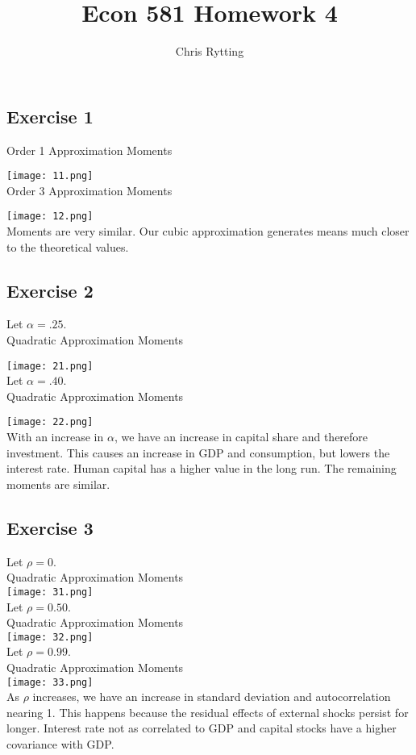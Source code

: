 \documentclass[letterpaper,12pt]{article}
\theoremstyle{definition}
\begin{document}
\title{Econ 581 Homework 4}
\author{Chris Rytting}
\maketitle
\subsection*{Exercise 1}
Order 1 Approximation Moments

\texttt{[image: 11.png]}\\

Order 3 Approximation Moments

\texttt{[image: 12.png]}\\

Moments are very similar.
Our cubic approximation generates means much closer to the theoretical values. 

\subsection*{Exercise 2}
Let $\alpha = .25$.\\
Quadratic Approximation Moments

\texttt{[image: 21.png]}\\

Let $\alpha = .40$.\\
Quadratic Approximation Moments

\texttt{[image: 22.png]}\\

With an increase in $\alpha$, we have an increase in capital share and therefore investment. This causes an increase in GDP and consumption, but lowers the interest rate. Human capital has a higher value in the long run. The remaining moments are similar.

\subsection*{Exercise 3}
Let $\rho = 0$.\\
Quadratic Approximation Moments\\
\texttt{[image: 31.png]}\\


Let $\rho = 0.50$.\\
Quadratic Approximation Moments\\
\texttt{[image: 32.png]}\\

Let $\rho = 0.99$.\\
Quadratic Approximation Moments\\
\texttt{[image: 33.png]}\\

As $\rho$ increases, we have an increase in standard deviation and autocorrelation nearing 1. This happens because the residual effects of external shocks persist for longer. Interest rate not as correlated to GDP and capital stocks have a higher covariance with GDP.
\end{document}
